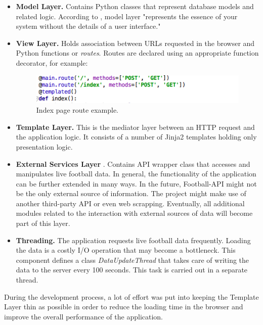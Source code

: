 \begin{itemize}
    \item \textbf{Model Layer.} Contains Python classes that represent database models and related logic. According to \cite{article:goodArchitecture}, model layer "represents the essence of your system without the details of a user interface."
    \item \textbf{View Layer.} Holds association between URLs requested in the browser and Python functions or \emph{routes}. Routes are declared using an appropriate function decorator, for example:

\begin{figure}[H]
    \begin{center}
        \includegraphics[width=.40\linewidth,natwidth=610,natheight=642]{impl/images/indexPageRoute}
        \caption{Index page route example.} \label{fig:using:indexPageRoute}
    \end{center}
\end{figure}     
        
    \item \textbf{Template Layer.} This is the mediator layer between an HTTP request and the application logic. It consists of a number of Jinja2 templates holding only     presentation logic. 
    \item \textbf{External Services Layer} \cite{article:goodArchitecture}. Contains API wrapper class that accesses and manipulates live football data. In general, the functionality of the application can be further extended in many ways. In the future, Football-API might not be the only external source of information. The project might make use of another third-party API or even web scrapping. Eventually, all additional modules related to the interaction with external sources of data will become part of this layer.
    \item \textbf{Threading.} The application requests live football data frequently. Loading the data is a costly I/O operation that may become a bottleneck. This component defines a class \emph{DataUpdateThread} that takes care of writing the data to the server every 100 seconds. This task is carried out in a separate thread. 
\end{itemize}

During the development process, a lot of effort was put into keeping the Template Layer thin as possible in order to reduce the loading time in the browser and improve the overall performance of the application.

